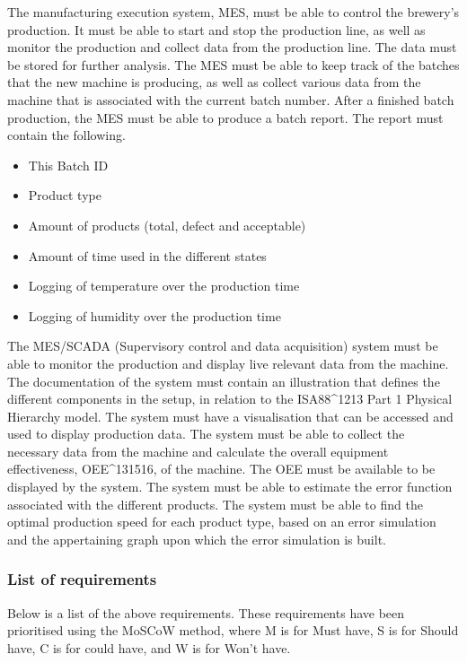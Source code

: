 The manufacturing execution system, MES, must be able to control the brewery’s production.
It must be able to start and stop the production line,
as well as monitor the production and collect data from the production line.
The data must be stored for further analysis.
The MES must be able to keep track of the batches that the new machine is producing,
as well as collect various data from the machine that is associated with the current batch number.
After a finished batch production, the MES must be able to produce a batch report.
The report must contain the following.

\begin{itemize}
    \item This Batch ID
    \item Product type
    \item Amount of products (total, defect and acceptable)
    \item Amount of time used in the different states
    \item Logging of temperature over the production time
    \item Logging of humidity over the production time
\end{itemize}

The MES/SCADA (Supervisory control and data acquisition) system must be able to monitor the production and display live relevant data from the machine.
The documentation of the system must contain an illustration that defines the different components in the setup, in relation to the ISA88\^{}1213 Part 1 Physical Hierarchy model.
The system must have a visualisation that can be accessed and used to display production data.
The system must be able to collect the necessary data from the machine and calculate the overall equipment effectiveness, OEE\^{}131516, of the machine. The OEE must be available to be displayed by the system.
The system must be able to estimate the error function associated with the different products.
The system must be able to find the optimal production speed for each product type, based on an error simulation and the appertaining graph upon which the error simulation is built.

\subsubsection{List of requirements}
Below is a list of the above requirements. These requirements have been
prioritised using the MoSCoW method, where M is for Must have, S is for
Should have, C is for could have, and W is for Won't have. 

